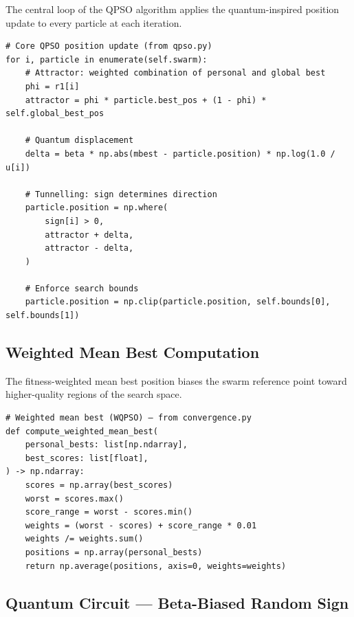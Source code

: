 The central loop of the QPSO algorithm applies the quantum-inspired
position update to every particle at each iteration.

\begin{verbatim}
# Core QPSO position update (from qpso.py)
for i, particle in enumerate(self.swarm):
    # Attractor: weighted combination of personal and global best
    phi = r1[i]
    attractor = phi * particle.best_pos + (1 - phi) * self.global_best_pos

    # Quantum displacement
    delta = beta * np.abs(mbest - particle.position) * np.log(1.0 / u[i])

    # Tunnelling: sign determines direction
    particle.position = np.where(
        sign[i] > 0,
        attractor + delta,
        attractor - delta,
    )

    # Enforce search bounds
    particle.position = np.clip(particle.position, self.bounds[0], self.bounds[1])
\end{verbatim}


\subsection{Weighted Mean Best Computation}
\label{app:wqpso}

The fitness-weighted mean best position biases the swarm reference
point toward higher-quality regions of the search space.

\begin{verbatim}
# Weighted mean best (WQPSO) — from convergence.py
def compute_weighted_mean_best(
    personal_bests: list[np.ndarray],
    best_scores: list[float],
) -> np.ndarray:
    scores = np.array(best_scores)
    worst = scores.max()
    score_range = worst - scores.min()
    weights = (worst - scores) + score_range * 0.01
    weights /= weights.sum()
    positions = np.array(personal_bests)
    return np.average(positions, axis=0, weights=weights)
\end{verbatim}


\subsection{Quantum Circuit — Beta-Biased Random Sign}
\label{app:quantum-circuit}

